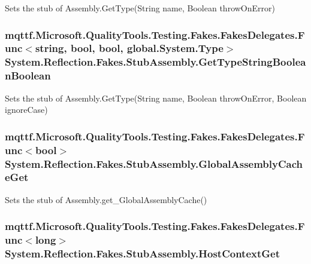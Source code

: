 Sets the stub of Assembly.\-Get\-Type(\-String name, Boolean throw\-On\-Error)

\hypertarget{class_system_1_1_reflection_1_1_fakes_1_1_stub_assembly_ac0e3780ee867a851d84881d6a321393d}{
\subsubsection[{Get\-Type\-String\-Boolean\-Boolean}]{\setlength{\rightskip}{0pt plus 5cm}mqttf.\-Microsoft.\-Quality\-Tools.\-Testing.\-Fakes.\-Fakes\-Delegates.\-Func$<$string, bool, bool, global.\-System.\-Type$>$ System.\-Reflection.\-Fakes.\-Stub\-Assembly.\-Get\-Type\-String\-Boolean\-Boolean}}\label{class_system_1_1_reflection_1_1_fakes_1_1_stub_assembly_ac0e3780ee867a851d84881d6a321393d}


Sets the stub of Assembly.\-Get\-Type(\-String name, Boolean throw\-On\-Error, Boolean ignore\-Case)

\hypertarget{class_system_1_1_reflection_1_1_fakes_1_1_stub_assembly_a9f529e8c80997d13f2f064ee901df6b2}{
\subsubsection[{Global\-Assembly\-Cache\-Get}]{\setlength{\rightskip}{0pt plus 5cm}mqttf.\-Microsoft.\-Quality\-Tools.\-Testing.\-Fakes.\-Fakes\-Delegates.\-Func$<$bool$>$ System.\-Reflection.\-Fakes.\-Stub\-Assembly.\-Global\-Assembly\-Cache\-Get}}\label{class_system_1_1_reflection_1_1_fakes_1_1_stub_assembly_a9f529e8c80997d13f2f064ee901df6b2}


Sets the stub of Assembly.\-get\-\_\-\-Global\-Assembly\-Cache()

\hypertarget{class_system_1_1_reflection_1_1_fakes_1_1_stub_assembly_af21ba53cdb381fd428cc39fdd3e35e25}{
\subsubsection[{Host\-Context\-Get}]{\setlength{\rightskip}{0pt plus 5cm}mqttf.\-Microsoft.\-Quality\-Tools.\-Testing.\-Fakes.\-Fakes\-Delegates.\-Func$<$long$>$ System.\-Reflection.\-Fakes.\-Stub\-Assembly.\-Host\-Context\-Get}}\label{class_system_1_1_reflection_1_1_fakes_1_1_stub_assembly_af21ba53cdb381fd428cc39fdd3e35e25}


